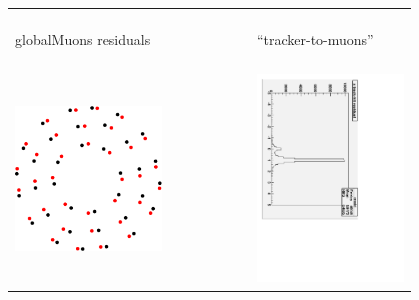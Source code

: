 \documentclass[compress]{beamer}
\begin{document}
\begin{frame}
\begin{center}
\begin{tabular}{p{0.4\linewidth} c p{0.4\linewidth}}
\begin{minipage}{\linewidth}
  \end{minipage} \\
  \begin{minipage}{\linewidth}
    \begin{center}
      globalMuons residuals
    \end{center}
  \end{minipage} & &
  \begin{minipage}{\linewidth}
    \begin{center}
      ``tracker-to-muons''
    \end{center}
  \end{minipage} \\
  & & \\
  \begin{minipage}{\linewidth}
    \begin{center}
      \includegraphics[width=0.6\linewidth]{wheel.pdf}
    \end{center}
  \end{minipage} & &
  \begin{minipage}{\linewidth}
    \includegraphics[height=\linewidth, angle=90]{xresid_deweighted_globalMuons.pdf}

\end{minipage}
\end{tabular}
\end{center}
\end{frame}
\end{document}
